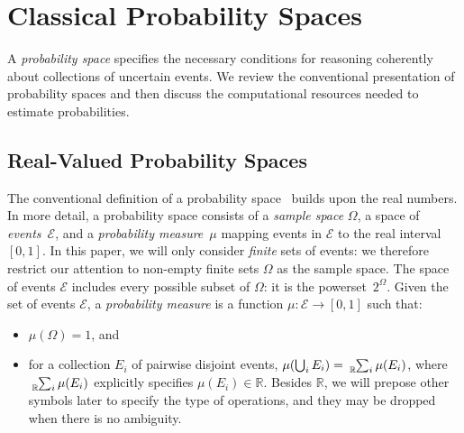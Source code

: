 \documentclass{article}
\theoremstyle{remark}
\newcommand{\events}{\ensuremath{\mathcal{E}}}
\newcommand{\pmeas}{\ensuremath{\mu}}
\begin{document}
\section{Classical Probability Spaces}
  
A \emph{probability space} specifies the necessary conditions for
reasoning coherently about collections of uncertain events.  We review
the conventional presentation of probability spaces and then discuss
the computational resources needed to estimate probabilities.

\subsection{Real-Valued Probability Spaces}

The conventional definition of a probability
space~\cite{Kolmogorov1950,Shafer1976,Griffiths2003,Swart2013}
builds upon the real numbers. In more detail, a probability space
consists of a \emph{sample space} $\Omega$, a space of
\emph{events}~$\events$, and a \emph{probability measure}~$\pmeas$
mapping events in $\events$ to the real interval $[0,1]$. In this
paper, we will only consider \emph{finite} sets of events: we
therefore restrict our attention to non-empty finite sets $\Omega$ as
the sample space. The space of events $\events$ includes every
possible subset of $\Omega$: it is the powerset~$2^\Omega$. Given the
set of events $\events$, a \emph{probability measure} is a function
$\pmeas : \events \rightarrow [0,1]$ such that:
\begin{itemize}
\item $\pmeas(\Omega) = 1$, and 
\item for a collection $E_{i}$ of pairwise disjoint events, $\pmeas(\bigcup_{i}E_{i})=\tensor*[_{\mathbb{R}}]{\sum}{_{i}}\pmeas(E_{i})$,
where $\tensor*[_{\mathbb{R}}]{\sum}{_{i}}\pmeas(E_{i})$
explicitly specifies $\pmeas(E_{i})\in\mathbb{R}$. Besides $\mathbb{R}$, we will
prepose other symbols later to specify the type of operations, and they may be
dropped when there is no ambiguity.
\end{itemize}
\end{document}
